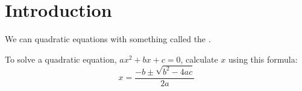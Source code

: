 \section*{Introduction}

We can  quadratic equations with something called
the  .

\begin{tcolorbox}[center, width=6in]
    To solve a quadratic equation, $a x^2 + bx + c = 0$,
    calculate $x$ using this formula:
    {
        \large
        \[
            x = \frac
                {-b \pm \sqrt{b^2 - 4ac}}
                {2a}
        \]
    }
\end{tcolorbox}
